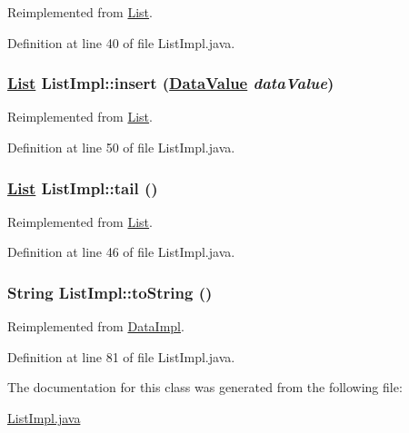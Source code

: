 Reimplemented from \hyperlink{interfaceList_a0}{List}.

Definition at line 40 of file List\-Impl.java.\hypertarget{classListImpl_a2}{
\subsubsection[insert]{\setlength{\rightskip}{0pt plus 5cm}\hyperlink{interfaceList}{List} List\-Impl::insert (\hyperlink{interfaceDataValue}{Data\-Value} {\em data\-Value})}}
\label{classListImpl_a2}




Reimplemented from \hyperlink{interfaceList_a2}{List}.

Definition at line 50 of file List\-Impl.java.\hypertarget{classListImpl_a1}{
\subsubsection[tail]{\setlength{\rightskip}{0pt plus 5cm}\hyperlink{interfaceList}{List} List\-Impl::tail ()}}
\label{classListImpl_a1}




Reimplemented from \hyperlink{interfaceList_a1}{List}.

Definition at line 46 of file List\-Impl.java.\hypertarget{classListImpl_a6}{
\subsubsection[toString]{\setlength{\rightskip}{0pt plus 5cm}String List\-Impl::to\-String ()}}
\label{classListImpl_a6}




Reimplemented from \hyperlink{classDataImpl_a6}{Data\-Impl}.

Definition at line 81 of file List\-Impl.java.

The documentation for this class was generated from the following file:\begin{CompactItemize}
\item 
\hyperlink{ListImpl_8java-source}{List\-Impl.java}\end{CompactItemize}
